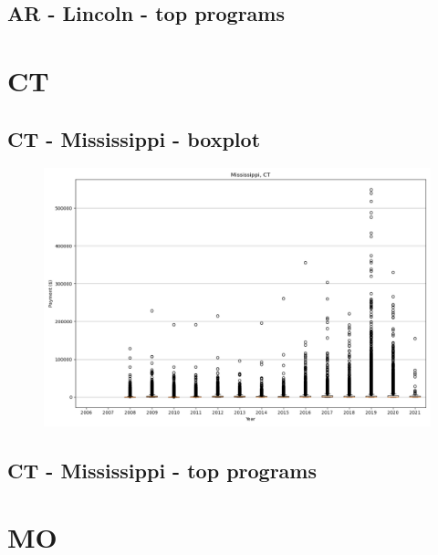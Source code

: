 \subsection*{AR - Lincoln - top programs}

\newpage
\section*{CT}
\subsection*{CT - Mississippi - boxplot}
\begin{figure}[h]
\centering
\includegraphics[width=7in]{../output/boxplots/counties/Mississippi-CT_boxplot.png}
\end{figure}


\subsection*{CT - Mississippi - top programs}

\newpage
\section*{MO}
